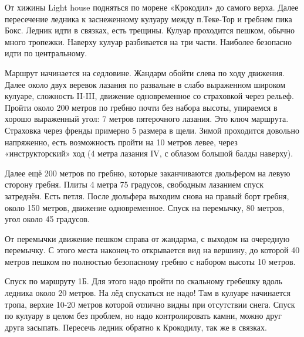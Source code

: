 От хижины Light house подняться по морене «Крокодил» до самого верха.
Далее пересечение ледника к заснеженному кулуару между п.Теке-Тор и
гребнем пика Бокс. Ледник идти в связках, есть трещины. Кулуар
проходится пешком, обычно много тропежки. Наверху кулуар разбивается
на три части. Наиболее безопасно идти по центральному.

Маршрут начинается на седловине. Жандарм обойти слева по ходу
движения. Далее около двух веревок лазания по развальне в слабо
выраженном широком кулуаре, сложность II-III, движение одновременное
со страховкой через рельеф. Пройти около 200 метров по гребню почти
без набора высоты, упираемся в хорошо выраженный угол: 7 метров
пятерочного лазания. Это ключ маршрута. Страховка через френды
примерно 5 размера в щели. Зимой проходится довольно напряженно, есть
возможность пройти на 10 метров левее, через «инструкторский» ход (4
метра лазания IV, с облазом большой балды наверху).

Далее ещё 200 метров по гребню, которые заканчиваются дюльфером на
левую сторону гребня. Плиты 4 метра 75 градусов, свободным лазанием
спуск затреднён. Есть петля. После дюльфера выходим снова на правый
борт гребня, около 150 метров, движение одновременное. Спуск на
перемычку, 80 метров, угол около 45 градусов.

От перемычки движение пешком справа от жандарма, с выходом на
очередную перемычку. С этого места наконец-то открывается вид на
вершину, до которой 40 метров пешком по полностью безопасному гребню с
набором высоты 10 метров.

Спуск по маршруту 1Б. Для этого надо пройти по скальному гребешку
вдоль ледника около 20 метров. На лёд спускаться не надо! Там в
кулуаре начинается тропа, верхие 10-20 метров которой отлично видны при
отсутствии снега. Спуск по кулуару в целом без проблем, но надо
контролировать камни, можно друг друга засыпать. Пересечь ледник
обратно к Крокодилу, так же в связках.
